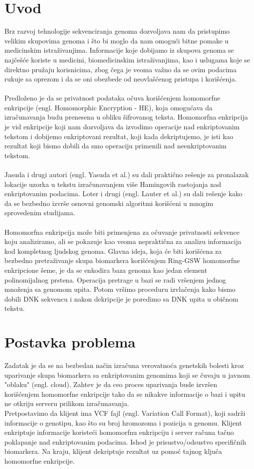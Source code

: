 \documentclass[a4paper]{article}
\begin{document}
\section{Uvod}
\label{sec:uvod}
Brz razvoj tehnologije sekvenciranja genoma dozvoljava nam da pristupimo velikim skupovima genoma i što bi moglo da nam omogući bitne pomake u medicinskim istraživanjima. Informacije koje dobijamo iz skupova genoma se najčešće koriste u medicini, biomedicinskim istraživanjima, kao i uslugama koje se direktno pružaju korisnicima, zbog čega je veoma važno da se ovim podacima rukuje sa oprezom i da se oni obezbede od neovlašćenog pristupa i korišćenja.\\\\
Predloženo je da se privatnost podataka očuva korišćenjem homomorfne enkripcije (engl. Homomorphic Encryption - HE), koja omogućava da izračunavanja budu prenesena u obliku šifrovanog teksta.
Homomorfna enkripcija je vid enkripcije koji nam dozvoljava da izvodimo operacije nad enkriptovanim tekstom i dobijemo enkriptovani rezultat, koji kada dekriptujemo, je isti kao rezultat koji bismo dobili da smo operaciju primenili nad neenkriptovanim tekstom.\\\\ Jasuda i drugi autori (engl. Yasuda et al.) su dali praktično rešenje za pronalazak lokacije uzorka u tekstu izračunavanjem više Hamingovih rastojanja nad enkriptovanim podacima. Loter i drugi (engl. Lauter et al.) su dali rešenje kako da se bezbedno izvrše osnovni genomski algoritmi korišćeni u mnogim sprovedenim studijama.\\\\
Homomorfna enkripcija može biti primenjena za očuvanje privatnosti sekvence koju analiziramo, ali se pokazuje kao veoma nepraktična za analizu informacija kod kompletnog ljudskog genoma.
Glavna ideja, koja će biti korišćena za bezbedno pretraživanje skupa biomarkera korišćenjem Ring-GSW homomorfne enkripcione šeme, je da se enkodira baza genoma kao jedan element polinomijalnog prstena. Operacija pretrage u bazi se radi vršenjem jednog množenja sa genomom upita. Potom vršimo proceduru izvlačenja kako bismo dobili DNK sekvencu i nakon dekripcije je poredimo sa DNK upita u običnom tekstu. 

\section{Postavka problema}
Zadatak je da se na bezbedan način izračuna verovatnoća genetskih bolesti kroz uparivanje skupa biomarkera sa enkriptovanim genomima koji se čuvaju u javnom "oblaku" (engl. cloud). Zahtev je da ceo proces uparivanja bude izvršen korišćenjem homomorfne enkripcije tako da se nikakve informacije o bazi i upitu ne otkriju serveru prilikom izračunavanja.\\
Pretpostavimo da klijent ima VCF fajl (engl. Variation Call Format), koji sadrži informacije o genotipu, kao što su broj hromozoma i pozicija u genomu. Klijent enkriptuje informacije koristeći homomorfnu enkripciju i server računa tačno poklapanje nad enkriptovanim podacima. Ishod je prisustvo/odsustvo specifičnih biomarkera. Na kraju, klijent dekriptuje rezultat uz pomoć tajnog ključa homomorfne enkripcije.
\end{document}
